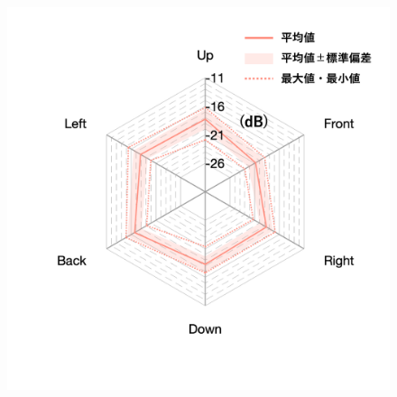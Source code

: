 \documentclass[11pt,a4j]{jreport}
\begin{document}
\begin{figure}[H]
\begin{minipage}[b]{.33\textwidth}
    \label{fig:S02early}
  \end{minipage}%
  \begin{minipage}[b]{.33\textwidth}
    \centering
    \includegraphics[width=1\linewidth]{images/realHallDirSt/early_S01_withLegend.png}
    \label{fig:S01early}
  \end{minipage}


\end{figure}
\end{document}
